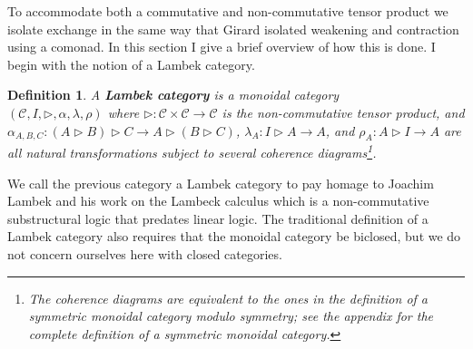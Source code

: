 \documentclass{sigplanconf}
\let\mto\to
\let\to\relax
\newcommand{\to}{\rightarrow}
\newcommand{\cat}[1]{\mathcal{#1}}
\newtheorem{definition}[theorem]{Definition}
\begin{document}

To accommodate both a commutative and non-commutative tensor product
we isolate exchange in the same way that Girard isolated weakening and
contraction using a comonad.  In this section I give a brief overview
of how this is done.  I begin with the notion of a Lambek category.
\begin{definition}
  \label{def:Lambek-category}
  A \textbf{Lambek category} is a monoidal category \\ $(\cat{C}, I,
  \rhd, \alpha, \lambda, \rho)$ where $\rhd : \cat{C} \times \cat{C}
  \mto \cat{C}$ is the non-commutative tensor product, and
  $\alpha_{A,B,C} : (A \rhd B) \rhd C \mto A \rhd (B \rhd C)$,
  $\lambda_A : I \rhd A \mto A$, and $\rho_A : A \rhd I \mto A$ are
  all natural transformations subject to several coherence
  diagrams\footnote{The coherence diagrams are equivalent to the ones
    in the definition of a symmetric monoidal category modulo
    symmetry; see the appendix for the complete definition of a
    symmetric monoidal category.}.
\end{definition}
\noindent
We call the previous category a Lambek category to pay homage to
Joachim Lambek and his work on the Lambeck calculus \cite{Lambek1958}
which is a non-commutative substructural logic that predates linear
logic.  The traditional definition of a Lambek category also requires
that the monoidal category be biclosed, but we do not concern
ourselves here with closed categories.
\end{document}
